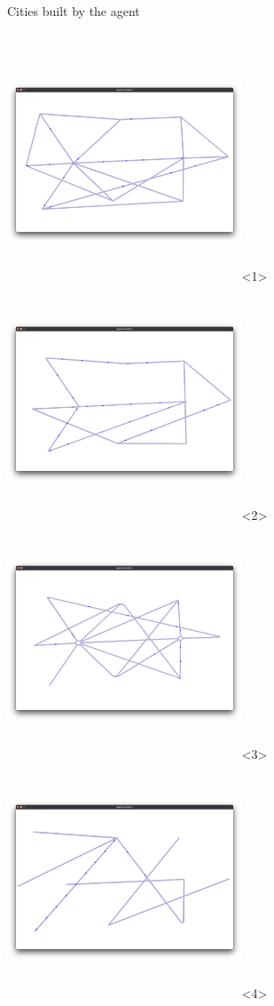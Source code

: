 \documentclass[english, aspectratio=169]{beamer}
\begin{document}
\begin{frame}{Cities built by the agent}
\begin{columns}[T]
\begin{column}{0.5\textwidth}
	\includegraphics[width=7cm, height=7cm, keepaspectratio]{images/city_agent_gcnn_2023-05-03_23-33_test_5_intersection}<1>
	\includegraphics[width=7cm, height=7cm, keepaspectratio]{images/city_agent_gcnn_2023-04-29_18-06_test_5_intersection_empty}<2>
	\includegraphics[width=7cm, height=7cm, keepaspectratio]{images/city_agent_enn_2023-05-04_10-53_test_5_intersection}<3>
	\includegraphics[width=7cm, height=7cm, keepaspectratio]{images/city_agent_enn_2023-05-04_22-59_test_5_intersection_empty}<4>

\end{column}
\end{columns}
\end{frame}
\end{document}
